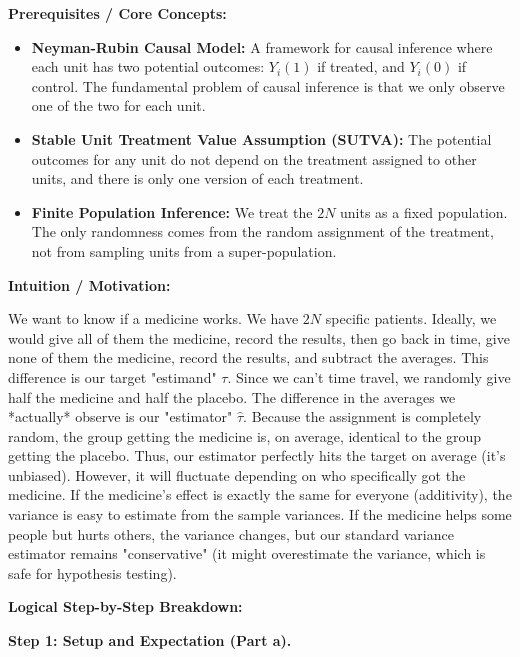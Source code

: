 \begin{solution}
\textbf{Prerequisites / Core Concepts:}
\begin{itemize}
    \item \textbf{Neyman-Rubin Causal Model:} A framework for causal inference where each unit has two potential outcomes: $Y_i(1)$ if treated, and $Y_i(0)$ if control. The fundamental problem of causal inference is that we only observe one of the two for each unit.
    \item \textbf{Stable Unit Treatment Value Assumption (SUTVA):} The potential outcomes for any unit do not depend on the treatment assigned to other units, and there is only one version of each treatment.
    \item \textbf{Finite Population Inference:} We treat the $2N$ units as a fixed population. The only randomness comes from the random assignment of the treatment, not from sampling units from a super-population.
\end{itemize}

\textbf{Intuition / Motivation:}

We want to know if a medicine works. We have $2N$ specific patients. Ideally, we would give all of them the medicine, record the results, then go back in time, give none of them the medicine, record the results, and subtract the averages. This difference is our target "estimand" $\tau$.
Since we can't time travel, we randomly give half the medicine and half the placebo. The difference in the averages we *actually* observe is our "estimator" $\hat{\tau}$.
Because the assignment is completely random, the group getting the medicine is, on average, identical to the group getting the placebo. Thus, our estimator perfectly hits the target on average (it's unbiased).
However, it will fluctuate depending on who specifically got the medicine. If the medicine's effect is exactly the same for everyone (additivity), the variance is easy to estimate from the sample variances. If the medicine helps some people but hurts others, the variance changes, but our standard variance estimator remains "conservative" (it might overestimate the variance, which is safe for hypothesis testing).

\textbf{Logical Step-by-Step Breakdown:}

\textbf{Step 1: Setup and Expectation (Part a).}


\end{solution}
